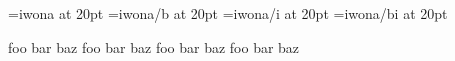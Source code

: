 \ifdefined\directlua\fi
\font\iwona           =iwona      at 20pt
\font\iwonabold       =iwona/b    at 20pt
\font\iwonaitalic     =iwona/i    at 20pt
\font\iwonabolditalic =iwona/bi   at 20pt

\def\test{foo bar baz \endgraf}
{\iwona           \test}
{\iwonabold       \test}
{\iwonaitalic     \test}
{\iwonabolditalic \test}
\bye
